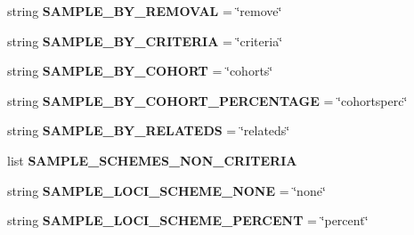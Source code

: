 \begin{DoxyCompactItemize}
\item 
string {\bfseries S\+A\+M\+P\+L\+E\+\_\+\+B\+Y\+\_\+\+R\+E\+M\+O\+V\+AL} = \char`\"{}remove\char`\"{}\hypertarget{namespacenegui_1_1pgdriveneestimator_a9ec6d87d70349dd43f33a16cfa7e68c0}{}\label{namespacenegui_1_1pgdriveneestimator_a9ec6d87d70349dd43f33a16cfa7e68c0}

\item 
string {\bfseries S\+A\+M\+P\+L\+E\+\_\+\+B\+Y\+\_\+\+C\+R\+I\+T\+E\+R\+IA} = \char`\"{}criteria\char`\"{}\hypertarget{namespacenegui_1_1pgdriveneestimator_a7faedb889c28308cf8fe4c57fcff39b4}{}\label{namespacenegui_1_1pgdriveneestimator_a7faedb889c28308cf8fe4c57fcff39b4}

\item 
string {\bfseries S\+A\+M\+P\+L\+E\+\_\+\+B\+Y\+\_\+\+C\+O\+H\+O\+RT} = \char`\"{}cohorts\char`\"{}\hypertarget{namespacenegui_1_1pgdriveneestimator_abc2562316b08e3e87ba66b5c7bcd6515}{}\label{namespacenegui_1_1pgdriveneestimator_abc2562316b08e3e87ba66b5c7bcd6515}

\item 
string {\bfseries S\+A\+M\+P\+L\+E\+\_\+\+B\+Y\+\_\+\+C\+O\+H\+O\+R\+T\+\_\+\+P\+E\+R\+C\+E\+N\+T\+A\+GE} = \char`\"{}cohortsperc\char`\"{}\hypertarget{namespacenegui_1_1pgdriveneestimator_a853653f5fbe4d6a095c97a852e222ea2}{}\label{namespacenegui_1_1pgdriveneestimator_a853653f5fbe4d6a095c97a852e222ea2}

\item 
string {\bfseries S\+A\+M\+P\+L\+E\+\_\+\+B\+Y\+\_\+\+R\+E\+L\+A\+T\+E\+DS} = \char`\"{}relateds\char`\"{}\hypertarget{namespacenegui_1_1pgdriveneestimator_ab490243dcfbfaf42e0e9454ebce74521}{}\label{namespacenegui_1_1pgdriveneestimator_ab490243dcfbfaf42e0e9454ebce74521}

\item 
list {\bfseries S\+A\+M\+P\+L\+E\+\_\+\+S\+C\+H\+E\+M\+E\+S\+\_\+\+N\+O\+N\+\_\+\+C\+R\+I\+T\+E\+R\+IA}
\item 
string {\bfseries S\+A\+M\+P\+L\+E\+\_\+\+L\+O\+C\+I\+\_\+\+S\+C\+H\+E\+M\+E\+\_\+\+N\+O\+NE} = \char`\"{}none\char`\"{}\hypertarget{namespacenegui_1_1pgdriveneestimator_a6d7da19fa549e375834075b13ebf02c5}{}\label{namespacenegui_1_1pgdriveneestimator_a6d7da19fa549e375834075b13ebf02c5}

\item 
string {\bfseries S\+A\+M\+P\+L\+E\+\_\+\+L\+O\+C\+I\+\_\+\+S\+C\+H\+E\+M\+E\+\_\+\+P\+E\+R\+C\+E\+NT} = \char`\"{}percent\char`\"{}\hypertarget{namespacenegui_1_1pgdriveneestimator_a312ff7ad92da1221ed16b20ced0bf49b}{}\label{namespacenegui_1_1pgdriveneestimator_a312ff7ad92da1221ed16b20ced0bf49b}


\end{DoxyCompactItemize}
